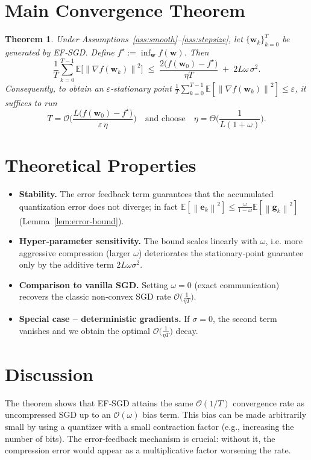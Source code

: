 \documentclass{article}
\newtheorem{theorem}{Theorem}
\newcommand{\E}{\mathbb{E}}
\newcommand{\norm}[1]{\left\lVert #1\right\rVert}
\begin{document}
\section*{Main Convergence Theorem}
\begin{theorem}\label{thm:main}
Under Assumptions~\ref{ass:smooth}--\ref{ass:stepsize}, let $\{\bm w_k\}_{k=0}^{T}$ be generated by EF‑SGD.
Define $f^\star:=\inf_{\bm w}f(\bm w)$. Then
\[
\frac{1}{T}\sum_{k=0}^{T-1}\E\!\big[\norm{\nabla f(\bm w_k)}^2\big]
\;\le\;
\frac{2\big(f(\bm w_0)-f^\star\big)}{\eta T}
\;+\;
2L\omega\,\sigma^2 .
\]
Consequently, to obtain an $\varepsilon$‑stationary point
$\frac{1}{T}\sum_{k=0}^{T-1}\E[\norm{\nabla f(\bm w_k)}^2]\le\varepsilon$,
it suffices to run
\[
T = \mathcal O\!\Big(\frac{L\big(f(\bm w_0)-f^\star\big)}{\varepsilon\,\eta}\Big)
\quad\text{and choose}\quad
\eta = \Theta\!\Big(\frac{1}{L(1+\omega)}\Big).
\]
\end{theorem}

\section*{Theoretical Properties}
\begin{itemize}[leftmargin=*]
\item \textbf{Stability.} The error feedback term guarantees that the accumulated quantization error does not diverge; in fact $\E[\norm{\bm e_{k}}^2]\le\frac{\omega}{1-\omega}\E[\norm{\bm g_k}^2]$ (Lemma~\ref{lem:error-bound}).
\item \textbf{Hyper‑parameter sensitivity.} The bound scales linearly with $\omega$, i.e. more aggressive compression (larger $\omega$) deteriorates the stationary‑point guarantee only by the additive term $2L\omega\sigma^2$.
\item \textbf{Comparison to vanilla SGD.} Setting $\omega=0$ (exact communication) recovers the classic non‑convex SGD rate $\mathcal{O}\big(\frac{1}{\eta T}\big)$.
\item \textbf{Special case – deterministic gradients.} If $\sigma=0$, the second term vanishes and we obtain the optimal $\mathcal{O}\big(\frac{1}{\eta T}\big)$ decay.
\end{itemize}

\section*{Discussion}
The theorem shows that EF‑SGD attains the same $\mathcal{O}(1/T)$ convergence rate as uncompressed SGD up to an $\mathcal{O}(\omega)$ bias term. This bias can be made arbitrarily small by using a quantizer with a small contraction factor (e.g., increasing the number of bits). The error‑feedback mechanism is crucial: without it, the compression error would appear as a multiplicative factor worsening the rate.
\end{document}
